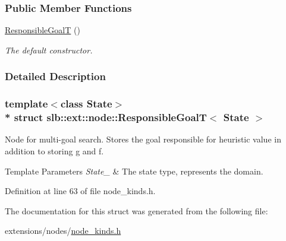 \subsubsection*{Public Member Functions}
\begin{DoxyCompactItemize}
\item 
\hyperlink{structslb_1_1ext_1_1node_1_1ResponsibleGoalT_a171689eae311e7ea2e510e46bab9f9be}{Responsible\+GoalT} ()\hypertarget{structslb_1_1ext_1_1node_1_1ResponsibleGoalT_a171689eae311e7ea2e510e46bab9f9be}{}\label{structslb_1_1ext_1_1node_1_1ResponsibleGoalT_a171689eae311e7ea2e510e46bab9f9be}

\begin{DoxyCompactList}\small\item\em The default constructor. \end{DoxyCompactList}\end{DoxyCompactItemize}


\subsubsection{Detailed Description}
\subsubsection*{template$<$class State$>$\\*
struct slb\+::ext\+::node\+::\+Responsible\+Goal\+T$<$ State $>$}

Node for multi-\/goal search. Stores the goal responsible for heuristic value in addition to storing {\ttfamily g} and {\ttfamily f}. 


\begin{DoxyTemplParams}{Template Parameters}
{\em State\+\_\+} & The state type, represents the domain. \\
\hline
\end{DoxyTemplParams}


Definition at line 63 of file node\+\_\+kinds.\+h.



The documentation for this struct was generated from the following file\+:\begin{DoxyCompactItemize}
\item 
extensions/nodes/\hyperlink{node__kinds_8h}{node\+\_\+kinds.\+h}\end{DoxyCompactItemize}
